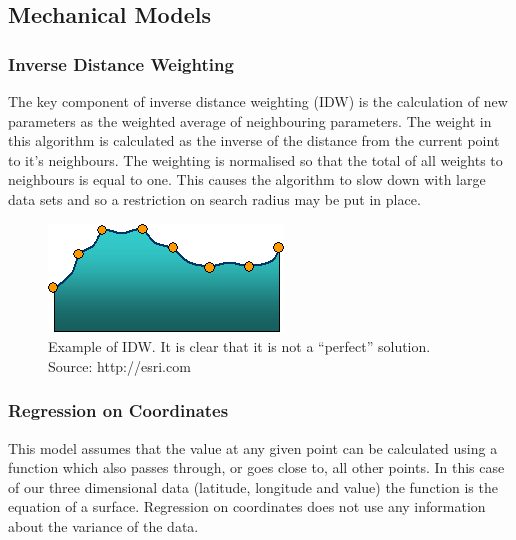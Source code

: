 

\subsection{Mechanical Models}\label{mechanicalmodels}

\subsubsection{Inverse Distance Weighting}\label{inverseweight}

The key component of inverse distance weighting (IDW) is the calculation of new parameters as the weighted average of neighbouring parameters. The weight in this algorithm is calculated as the inverse of the distance from the current point to it's neighbours. The weighting is normalised so that the total of all weights to neighbours is equal to one. This causes the algorithm to slow down with large data sets and so a restriction on search radius may be put in place. 

\begin{landscape}
	\begin{figure}[H]
    	\begin{center}
            \includegraphics[scale=0.5]{./images/mpp1/IDW.png}
            \caption{Example of IDW. It is clear that it is not a ``perfect'' solution. Source: http://esri.com}
            \label{fig:idw}
    	\end{center}
	\end{figure}
\end{landscape}

\subsubsection{Regression on Coordinates}\label{regressiononcoordinates}

This model assumes that the value at any given point can be calculated using a function which also passes through, or goes close to, all other points. In this case of our three dimensional data (latitude, longitude and value) the function is the equation of a surface. Regression on coordinates does not use any information about the variance of the data. 


